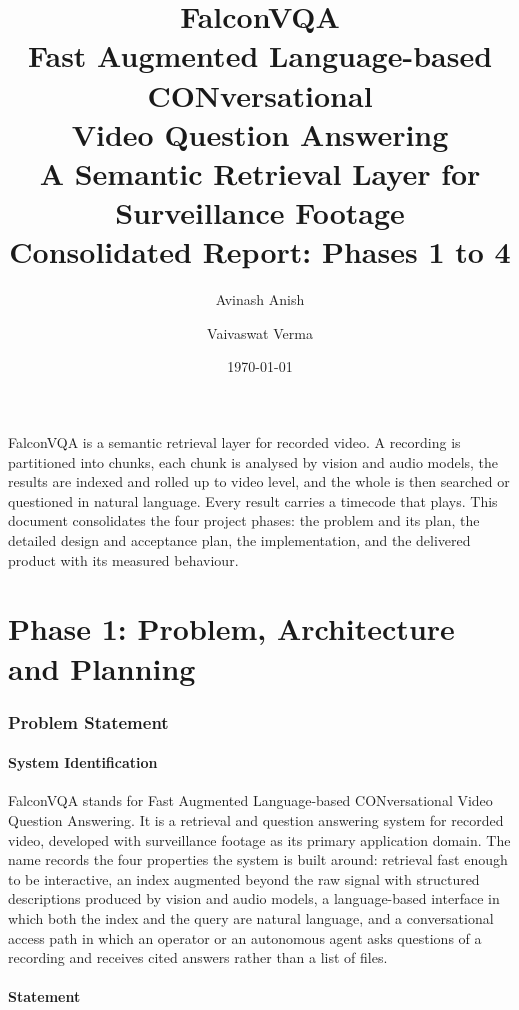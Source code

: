 \documentclass[11pt,a4paper]{article}
\title{\vspace{-1.5em}\textbf{FalconVQA}\\[0.3em]
       \large Fast Augmented Language-based CONversational\\
       Video Question Answering\\[0.4em]
       \normalsize A Semantic Retrieval Layer for Surveillance Footage\\[0.4em]
       \normalsize Consolidated Report: Phases 1 to 4}
\author{Avinash Anish \and Vaivaswat Verma}
\date{\today}
\begin{document}
\maketitle
\vspace{-2em}

\noindent
FalconVQA is a semantic retrieval layer for recorded video. A recording is
partitioned into chunks, each chunk is analysed by vision and audio models, the
results are indexed and rolled up to video level, and the whole is then searched
or questioned in natural language. Every result carries a timecode that plays.
This document consolidates the four project phases: the problem and its plan,
the detailed design and acceptance plan, the implementation, and the delivered
product with its measured behaviour.

\tableofcontents
\vspace{1em}

\part{Phase 1: Problem, Architecture and Planning}

\section{Problem Statement}

\subsection{System Identification}

FalconVQA stands for Fast Augmented Language-based CONversational Video Question
Answering. It is a retrieval and question answering system for recorded video,
developed with surveillance footage as its primary application domain. The name
records the four properties the system is built around: retrieval fast enough to
be interactive, an index augmented beyond the raw signal with structured
descriptions produced by vision and audio models, a language-based interface in
which both the index and the query are natural language, and a conversational
access path in which an operator or an autonomous agent asks questions of a
recording and receives cited answers rather than a list of files.

\subsection{Statement}
\end{document}
